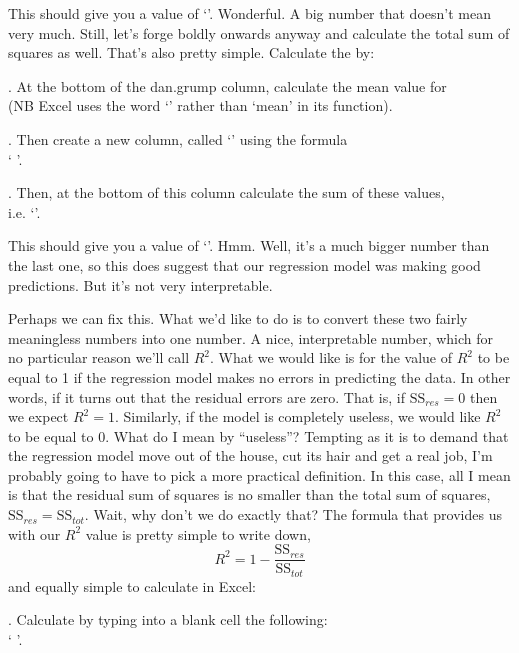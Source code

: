 This should give you a value of `'. Wonderful. A big number that doesn't mean very much. Still, let's forge boldly onwards anyway and calculate the total sum of squares as well. That's also pretty simple. Calculate the  by: 

. At the bottom of the dan.grump column, calculate the mean value for  \\(NB Excel uses the word `' rather than `mean' in its function).

. Then create a new column, called `' using the formula \\` '.

. Then, at the bottom of this column calculate the sum of these values, \\i.e. `'.

This should give you a value of `'. Hmm. Well, it's a much bigger number than the last one, so this does suggest that our regression model was making good predictions. But it's not very interpretable. 

Perhaps we can fix this. What we'd like to do is to convert these two fairly meaningless numbers into one number. A nice, interpretable number, which for no particular reason we'll call $R^2$. What we would like is for the value of $R^2$ to be equal to 1 if the regression model makes no errors in predicting the data. In other words, if it turns out that the residual errors are zero. That is, if $\mbox{SS}_{res} = 0$ then we expect $R^2 = 1$. Similarly, if the model is completely useless, we would like $R^2$ to be equal to 0. What do I mean by ``useless''? Tempting as it is to demand that the regression model move out of the house, cut its hair and get a real job, I'm probably going to have to pick a more practical definition. In this case, all I mean is that the residual sum of squares is no smaller than the total sum of squares, $\mbox{SS}_{res} = \mbox{SS}_{tot}$. Wait, why don't we do exactly that? The formula that provides us with our $R^2$ value is pretty simple to write down,
$$
R^2 = 1 - \frac{\mbox{SS}_{res}}{\mbox{SS}_{tot}}
$$
and equally simple to calculate in Excel: 

. Calculate  by typing into a blank cell the following: \\` '.

